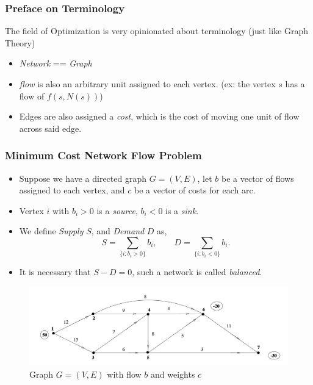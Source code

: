 \documentclass{beamer}
\begin{document}
	\begin{frame}
		\frametitle{Preface on Terminology}
		The field of Optimization is very opinionated about terminology (just like Graph Theory)
		\begin{itemize}
			\item \emph{Network} == \emph{Graph}
			\item \emph{flow} is also an arbitrary unit assigned to each vertex. (ex: the vertex $s$ has a flow of $f(s, N(s))$)
			\item Edges are also assigned a \emph{cost}, which is the cost of moving one unit of flow across said edge. 
		\end{itemize}

	\end{frame}

	\begin{frame}
		\frametitle{Minimum Cost Network Flow Problem}
		\begin{itemize}
			\item Suppose we have a directed graph $G = (V, E)$, let $b$ be a vector of flows assigned to each vertex, and $c$ be a vector of costs for each arc. 
			\vfill
			\item Vertex $i$ with $b_i > 0$ is a \emph{source}, $b_i < 0$ is a \emph{sink}.  
			\item We define \emph{Supply} $S$, and \emph{Demand} $D$ as,  
			\begin{equation*}
					S = \sum_{\{i :b_i > 0\}}b_i, \qquad D = \sum_{\{i: b_i < 0\}}b_i.
			\end{equation*}
			\item It is necessary that $S - D = 0$, such a network is called \emph{balanced}.  
		\end{itemize}
		\begin{figure}
			\begin{center}
			  \caption{Graph $G = (V, E)$ with flow $b$ and weights $c$}
			  \includegraphics[width=.90\textwidth]{SampleNetwork.png}
			\end{center}
		  \end{figure}
	\end{frame}
\end{document}

